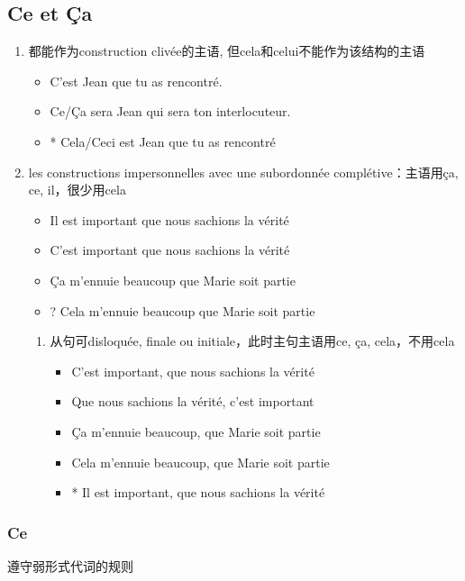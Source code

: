 \documentclass[UTF8]{report}
\begin{document}
\subsection{Ce et Ça}
\begin{enumerate}
    \item 都能作为construction clivée的主语, 但cela和celui不能作为该结构的主语
    \begin{itemize}
        \item C’est Jean que tu as rencontré.
        \item Ce/Ça sera Jean qui sera ton interlocuteur.
        \item * Cela/Ceci est Jean que tu as rencontré
    \end{itemize}
    \item les constructions impersonnelles avec une subordonnée complétive：主语用ça, ce, il，很少用cela
    \begin{itemize}
        \item Il est important que nous sachions la vérité
        \item C’est important que nous sachions la vérité
        \item Ça m’ennuie beaucoup que Marie soit partie
        \item ? Cela m’ennuie beaucoup que Marie soit partie
    \end{itemize}
    \begin{enumerate}
        \item 从句可disloquée, finale ou initiale，此时主句主语用ce, ça, cela，不用cela
        \begin{itemize}
            \item C’est important, que nous sachions la vérité
            \item Que nous sachions la vérité, c’est important
            \item Ça m’ennuie beaucoup, que Marie soit partie
            \item Cela m’ennuie beaucoup, que Marie soit partie
            \item * Il est important, que nous sachions la vérité
        \end{itemize}
    \end{enumerate}
\end{enumerate}
\subsubsection{Ce}
遵守弱形式代词的规则
\end{document}
